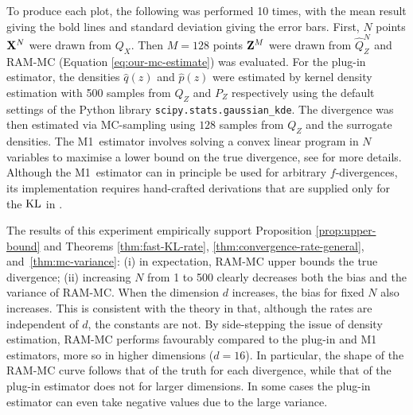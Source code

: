 To produce each plot, the following was performed 10 times, with the mean result giving the bold lines and standard deviation giving the error bars.
First, $N$ points $\mathbf{X}^N$ were drawn from $Q_X$. 
Then $M{=}128$ points $\mathbf{Z}^M$ were drawn from $\hat{Q}_Z^N$ and RAM-MC (Equation \ref{eq:our-mc-estimate}) was evaluated. 
For the plug-in estimator, the densities $\hat{q}(z)$ and $\hat{p}(z)$ were estimated by kernel density estimation with 500 samples from $Q_Z$ and $P_Z$ respectively using the default settings of the Python library {\texttt{scipy.stats.gaussian\_kde}}.
The divergence was then estimated via MC-sampling using $128$ samples from $Q_Z$ and the surrogate densities.
The M1~estimator involves solving a convex linear program in $N$ variables to maximise a lower bound on the true divergence, see \cite{nguyen10ratio} for more details.
Although the M1~estimator can in principle be used for arbitrary $f$-divergences, its implementation requires hand-crafted derivations that are supplied only for the $\mathrm{KL}$ in \cite{nguyen10ratio}.

The results of this experiment empirically support Proposition \ref{prop:upper-bound} and Theorems \ref{thm:fast-KL-rate}, \ref{thm:convergence-rate-general}, and~\ref{thm:mc-variance}:
(i) in expectation, RAM-MC upper bounds the true divergence; (ii) increasing $N$ from 1 to 500 clearly decreases both the bias and the variance of RAM-MC.
When the dimension $d$ increases, the bias for fixed $N$ also increases.
This is consistent with the theory in that, although the rates are independent of $d$, the constants are not.
By side-stepping the issue of density estimation, RAM-MC performs favourably compared to the plug-in and M1 estimators, more so in higher dimensions ($d=16$).
In particular, the shape of the RAM-MC curve follows that of the truth for each divergence, while that of the plug-in estimator does not for larger dimensions.
In some cases the plug-in estimator can even take negative values due to the large variance.


